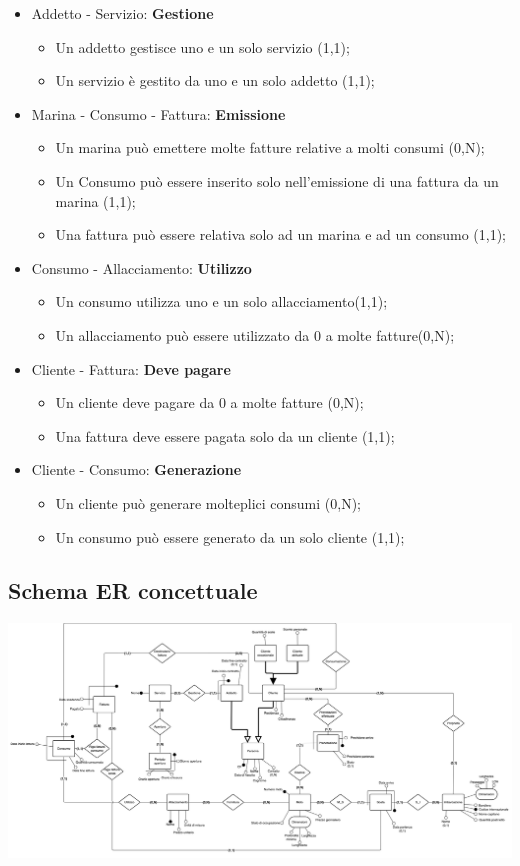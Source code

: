 \begin{itemize}
    \item Addetto - Servizio: \textbf{Gestione}
    \begin{itemize}
        \item Un addetto gestisce uno e un solo servizio (1,1);
        \item Un servizio è gestito da uno e un solo addetto (1,1);
    \end{itemize}
    
    \item Marina - Consumo - Fattura: \textbf{Emissione}
    \begin{itemize}
        \item Un marina può emettere molte fatture relative a molti consumi (0,N);
        \item Un Consumo può essere inserito solo nell'emissione di una fattura da un marina (1,1);
        \item Una fattura può essere relativa solo ad un marina e ad un consumo (1,1);
    \end{itemize}
    
    \item Consumo - Allacciamento: \textbf{Utilizzo}
    \begin{itemize}
        \item Un consumo utilizza uno e un solo allacciamento(1,1);
        \item Un allacciamento può essere utilizzato da 0 a molte fatture(0,N);
    \end{itemize}
    
    \item Cliente - Fattura: \textbf{Deve pagare}
    \begin{itemize}
        \item Un cliente deve pagare da 0 a molte fatture (0,N);
        \item Una fattura deve essere pagata solo da un cliente (1,1);
    \end{itemize}
    
    \item Cliente - Consumo: \textbf{Generazione}
    \begin{itemize}
        \item Un cliente può generare molteplici consumi (0,N);
        \item Un consumo può essere generato da un solo cliente (1,1);
    \end{itemize}
    
\end{itemize}

\subsection{Schema ER concettuale}
\includegraphics[width=\textwidth]{img/erconcettuale.png}